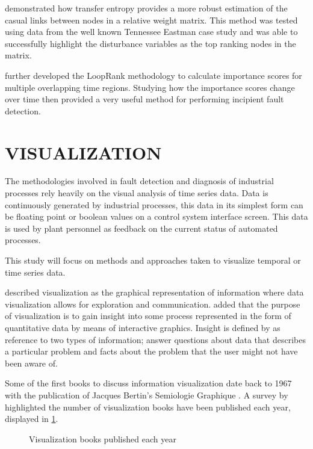 \cite{streicher2014eigenvector} demonstrated how transfer entropy provides a more robust estimation of the casual links between nodes in a relative weight matrix. This method was tested using data from the well known Tennessee Eastman case study and was able to successfully highlight the disturbance variables as the top ranking nodes in the matrix.

\cite{streicher2019plant} further developed the LoopRank methodology to calculate importance scores for multiple overlapping time regions. Studying how the importance scores change over time then provided a very useful method for performing incipient fault detection.  \\ 

\section{VISUALIZATION}

The methodologies involved in fault detection and diagnosis of industrial processes rely heavily on the visual analysis of time series data. Data is continuously generated by industrial processes, this data in its simplest form can be floating point or boolean values on a control system interface screen. This data is used by plant personnel as feedback on the current status of automated processes.

This study will focus on methods and approaches taken to visualize temporal or time series data. 

\cite{few2009now} described visualization as the graphical representation of information where data visualization allows for exploration and communication. \cite{telea2014data} added that the purpose of visualization is to gain insight into some process represented in the form of quantitative data by means of interactive graphics. Insight is defined by \cite{telea2014data} as reference to two types of information; answer questions about data that describes a particular problem and facts about the problem that the user might not have been aware of.

Some of the first books to discuss information visualization date back to 1967 with the publication of Jacques Bertin's Semiologie Graphique \cite{rees2019survey}. A survey by \cite{rees2019survey} highlighted the number of visualization books have been published each year, displayed in \ref{fig:1}.

\begin{figure}[!ht]
	
	\centering{}
	\caption{Visualization books published each year}\label{fig:1}
	
\end{figure}

